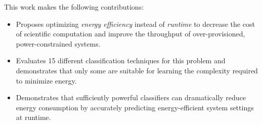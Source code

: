 This work makes the following contributions:
\begin{itemize}
\item Proposes optimizing \emph{energy efficiency} instead of \emph{runtime} to decrease the cost of scientific computation and improve the throughput of over-provisioned, power-constrained systems.
\item Evaluates 15 different classification techniques for this problem and demonstrates that only some are suitable for learning the complexity required to minimize energy.
\item Demonstrates that sufficiently powerful classifiers can dramatically reduce energy consumption by accurately predicting energy-efficient system settings at runtime.
\end{itemize}
